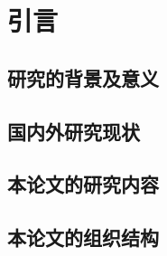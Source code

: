 

\chapter{引言}
\label{chap:introduction}
\section{研究的背景及意义}
\section{国内外研究现状}
\section{本论文的研究内容}
\section{本论文的组织结构}

